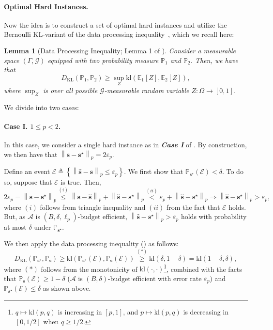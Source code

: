 \documentclass{article}
\def\vs{{\bm{s}}}
\def\gA{{\mathcal{A}}}
\def\gE{{\mathcal{E}}}
\def\gG{{\mathcal{G}}}
\def\sP{{\mathbb{P}}}
\newcommand{\E}{\mathbb{E}}
\newcommand{\KL}{D_{\mathrm{KL}}}
\newcommand{\kl}{\mathrm{kl}}
\theoremstyle{plain}
\newtheorem{lemma}[theorem]{Lemma}
\theoremstyle{definition}
\theoremstyle{plain}
\newcommand{\bignorm}[1]{\left\lVert #1 \right\rVert}
\begin{document}
\paragraph{Optimal Hard Instances.}
Now the idea is to construct a set of optimal hard instances and utilize the Bernoulli KL-variant of the data processing inequality~\citep[Lemma 1]{garivier2019lower}, which we recall here:
\begin{lemma}[Data Processing Inequality; Lemma 1 of \cite{garivier2019lower}]
\label{lem:data-processing}
    Consider a measurable space $(\Gamma, \gG)$ equipped with two probability measure $\sP_1$ and $\sP_2$.
    Then, we have that
    \begin{equation}
        \KL(\sP_1, \sP_2) \geq \sup_Z \kl(\E_1[Z], \E_2[Z]),
    \end{equation}
    where $\sup_Z$ is over all possible $\gG$-measurable random variable $Z : \Omega \rightarrow [0, 1]$.
\end{lemma}

We divide into two cases:
\paragraph{Case I. $1 \leq p < 2$.}
In this case, we consider a single hard instance as in \textbf{\textit{Case I}} of .
By construction, we then have that $\bignorm{\vs - \vs^\star}_p = 2\varepsilon_p$.

Define an event $\gE \triangleq \left\{ \bignorm{\hat{\vs} - \vs}_p \leq \varepsilon_p \right\}$.
We first show that $\sP_{\vs^\star}(\gE) < \delta.$
To do so, suppose that $\gE$ is true.
Then,
\begin{equation}
    2 \varepsilon_p = \bignorm{\vs - \vs^\star}_p
    \overset{(i)}{\leq} \bignorm{\vs - \hat{\vs}}_p + \bignorm{\hat{\vs} - \vs^\star}_p
    \overset{(ii)}{<} \varepsilon_p + \bignorm{\hat{\vs} - \vs^\star}_p
    \Longrightarrow
    \bignorm{\hat{\vs} - \vs^\star}_p > \varepsilon_p,
\end{equation}
where $(i)$ follows from triangle inequality and $(ii)$ from the fact that $\gE$ holds.
But, as $\gA$ is $(B, \delta, \ell_p)$-budget efficient, $\bignorm{\hat{\vs} - \vs^\star}_p > \varepsilon_p$ holds with probability at most $\delta$ under $\sP_{\vs^\star}$.

We then apply the data processing inequality () as follows:
\begin{equation}
\label{eqn:lower-bound}
    \KL(\sP_{\vs^\star}, \sP_{\vs})
    \geq \kl\left( \sP_{\vs^\star}(\gE), \sP_{\vs}(\gE) \right)
    \overset{(*)}{\geq} \kl\left( \delta, 1 - \delta \right) = \kl( 1 - \delta, \delta),
\end{equation}
where $(*)$ follows from the monotonicity of $\kl(\cdot, \cdot)$\footnote{$q \mapsto \kl(p, q)$ is increasing in $[p, 1]$, and $p \mapsto \kl(p, q)$ is decreasing in $[0, 1/2]$ when $q \geq 1/2$.}, combined with the facts that $\sP_{\vs}(\gE) \geq 1 - \delta$ ($\gA$ is $(B, \delta)$-budget efficient with error rate $\varepsilon_p$) and $\sP_{\vs^\star}(\gE) \leq \delta$ as shown above.
\end{document}
